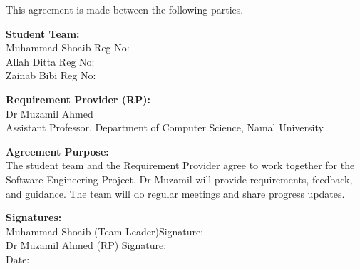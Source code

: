 \documentclass[12pt]{article}
\newcommand{\SubHeading}[1]{{\large \textbf{#1}}}
\begin{document}
\vspace{1cm}

\noindent
This agreement is made between the following parties.

\vspace{0.3cm}

\noindent
\SubHeading{Student Team:}\\
Muhammad Shoaib \hspace{1cm}Reg No: \underline{\hspace{4cm}}\\
Allah Ditta \hspace{2.45cm}Reg No: \underline{\hspace{4cm}}\\
Zainab Bibi \hspace{2.4cm}Reg No: \underline{\hspace{4cm}}\\

\vspace{0.5cm}

\noindent
\SubHeading{Requirement Provider (RP):}\\
Dr Muzamil Ahmed\\
Assistant Professor, Department of Computer Science, Namal University

\vspace{1cm}

\noindent
\SubHeading{Agreement Purpose:}\\
The student team and the Requirement Provider agree to work together for the Software Engineering Project. Dr Muzamil will provide requirements, feedback, and guidance. The team will do regular meetings and share progress updates.

\vspace{1cm}

\noindent
\SubHeading{Signatures:}\\
Muhammad Shoaib (Team Leader)\hspace{0.5cm}Signature: \underline{\hspace{4cm}}\\[0.1cm]
Dr Muzamil Ahmed (RP) \hspace{2.05cm}Signature: \underline{\hspace{4cm}}\\[0.5cm]
Date: \hspace{7.5cm} \underline{\hspace{4cm}}

\newpage
\tableofcontents
\newpage
\end{document}
